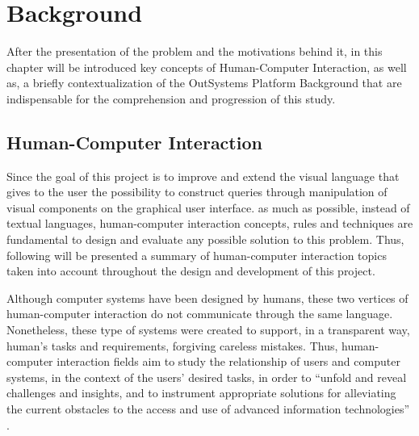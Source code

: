 \chapter{Background}
\label{cha:background}
After the presentation of the problem and the motivations behind it, in this chapter will be introduced key concepts of Human-Computer Interaction, as well as, a briefly contextualization of the OutSystems Platform Background that are indispensable for the comprehension and progression of this study.

\section{Human-Computer Interaction}
\label{sec:human_computer_interaction}
Since the goal of this project is to improve and extend the visual language that gives to the user the possibility to construct queries through manipulation of visual components on the graphical user interface. as much as possible, instead of textual languages, human-computer interaction concepts, rules and techniques are fundamental to design and evaluate any possible solution to this problem. Thus, following will be presented a summary of human-computer interaction topics taken into account throughout the design and development of this project.

Although computer systems have been designed by humans, these two vertices of human-computer interaction do not communicate through the same language. Nonetheless, these type of systems were created to support, in a transparent way, human’s tasks and requirements, forgiving careless mistakes. Thus, human-computer interaction fields aim to study the relationship of users and computer systems, in the context of the users’ desired tasks, in order to “unfold and reveal challenges and insights, and to instrument appropriate solutions for alleviating the current obstacles to the access and use of advanced information technologies” \cite{userInterfacesForAll_newPerspectivesIntoHumanComputerInteraction}. 


